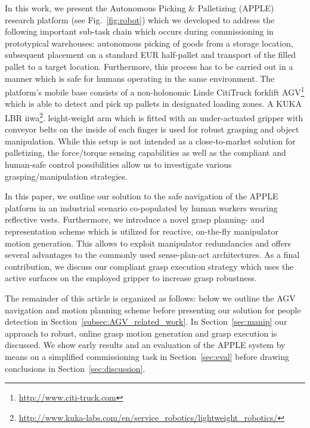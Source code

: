 In this work, we present the Autonomous Picking \& Palletizing (APPLE) research platform (see
Fig.~\ref{fig:robot}) which we developed to address the following important sub-task chain which
occurs during commissioning in prototypical warehouses: autonomous picking of goods from a storage
location, subsequent placement on a standard EUR half-pallet and transport of the filled pallet to a
target location. Furthermore, this process has to be carried out in a manner which is safe for
humans operating in the same environment. The platform's mobile base consists of a non-holonomic
Linde CitiTruck forklift AGV\footnote{\url{ http://www.citi-truck.com}} which is able to detect and
pick up pallets in designated loading zones. A KUKA LBR
iiwa\footnote{\url{http://www.kuka-labs.com/en/service_robotics/lightweight_robotics/}}.
leight-weight arm which is fitted with an under-actuated gripper with conveyor belts on the inside
of each finger is used for robust grasping and object manipulation. While this setup is not intended
as a close-to-market solution for palletizing, the force/torque sensing capabilities as well as the
compliant and human-safe control possibilities allow us to investigate various grasping/manipulation
strategies.

  In this paper, we outline our solution to the safe navigation of the APPLE platform in
an industrial scenario co-populated by human workers wearing reflective vests. Furthermore, we
introduce a novel grasp planning- and representation scheme which is utilized for reactive,
on-the-fly manipulator motion generation. This allows to exploit manipulator redundancies and offers
several advantages to the commonly used sense-plan-act architectures. As a final contribution, we
discuss our compliant grasp execution strategy which uses the active surfaces on the employed
gripper to increase grasp robustness.

The remainder of this article is organized as follows: below we outline the AGV navigation and
motion planning scheme before presenting our solution for people detection in
Section~\ref{subsec:AGV_related_work}. In Section~\ref{sec:manip} our approach to robust, online
grasp motion generation and grasp execution is discussed. We show early results and an evaluation of
the APPLE system by means on a simplified commissioning task in Section~\ref{sec:eval} before
drawing conclusions in Section~\ref{sec:discussion}.
